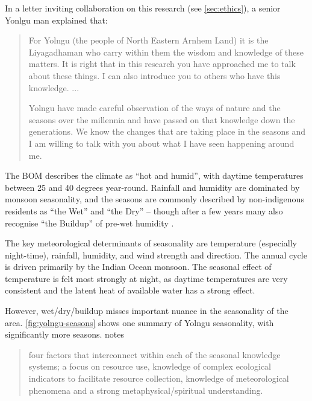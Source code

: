 

In a letter inviting collaboration on this research (see \autoref{sec:ethics}),
a senior Yonlgu man explained that:

\blockquote{
    For Yolngu (the people of North Eastern Arnhem Land) it is the Liyagadhaman
    who carry within them the wisdom and knowledge of these matters.
    It is right that in this research you have approached me to talk about these
    things. I can also introduce you to others who have this knowledge.  ...

    Yolngu have made careful observation of the ways of nature and the seasons
    over the millennia and have passed on that knowledge down the generations.
    We know the changes that are taking place in the seasons and I am willing
    to talk with you about what I have seen happening around me.
}




The BOM describes the 
climate as ``hot and humid'', with daytime temperatures between 25 and 40 
degrees year-round.  Rainfall and humidity are dominated by monsoon 
seasonality, and the seasons are commonly described by non-indigenous residents 
as “the Wet” and “the Dry” – though after a few years many also recognise “the 
Buildup” of pre-wet humidity \citep{willmett2009}.

The key meteorological determinants of seasonality are temperature (especially 
night-time), rainfall, humidity, and wind strength and direction.  The annual 
cycle is driven primarily by the Indian Ocean monsoon.  The seasonal effect of 
temperature is felt most strongly at night, as daytime temperatures are very 
consistent and the latent heat of available water has a strong effect.

However, wet/dry/buildup misses important nuance in the seasonality of the 
area.  \autoref{fig:yolngu-seasons} shows one summary of Yolngu seasonality,
with significantly more seasons.  \citet{woodward2012b} notes
\blockquote{
    four factors that interconnect within each of the seasonal
    knowledge systems; a focus on resource use, knowledge of complex
    ecological indicators to facilitate resource collection,
    knowledge of meteorological phenomena and a strong
    metaphysical/spiritual understanding.
}

